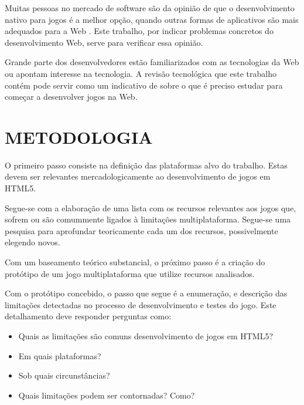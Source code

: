 Muitas pessoas no mercado de software são da opinião de que o
desenvolvimento nativo para jogos é a melhor opção, quando outras
formas de aplicativos são mais adequados para a Web \cite[p.
21]{aSeriousContender}. Este trabalho, por indicar problemas concretos
do desenvolvimento Web, serve para verificar essa opinião.

Grande parte dos desenvolvedores estão familiarizados com as
tecnologias da Web ou apontam interesse na tecnologia. A revisão
tecnológica que este trabalho contém pode servir como um indicativo
de sobre o que é preciso estudar para começar a desenvolver jogos na
Web.

\section{METODOLOGIA}
\thispagestyle{myheadings}

O primeiro passo consiste na definição das plataformas alvo do trabalho.
Estas devem ser relevantes mercadologicamente ao desenvolvimento de
jogos em HTML5.

Segue-se com a elaboração de uma lista com os recursos relevantes
aos jogos que, sofrem ou são comummente ligados à
limitações multiplataforma. Segue-se uma pesquisa para aprofundar
teoricamente cada um dos recursos, possivelmente elegendo novos.

Com um baseamento teórico substancial, o próximo passo é a criação
do protótipo de um jogo multiplataforma que utilize recursos
analisados.

Com o protótipo concebido, o passo que segue é a enumeração, e
descrição das limitações detectadas no processo de desenvolvimento e
testes do jogo. Este detalhamento deve responder perguntas como:

\begin{itemize}
\item Quais as limitações são comuns desenvolvimento de jogos em HTML5?
\item Em quais plataformas?
\item Sob quais circunstâncias?
\item Quais limitações podem ser contornadas? Como?
\end{itemize}

